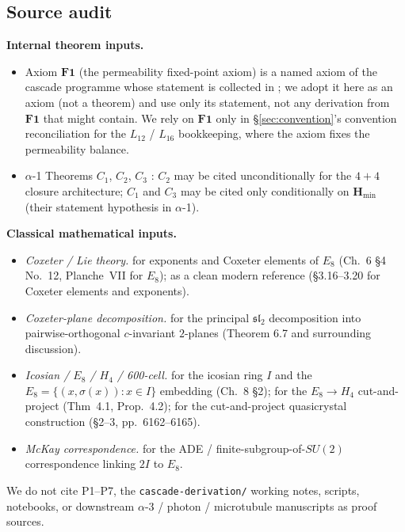 \documentclass[11pt, a4paper]{amsart}
\theoremstyle{definition}
\newcommand{\Hmin}{\mathbf{H}_{\min}}
\begin{document}
\subsection{Source audit}

\textbf{Internal theorem inputs.}
\begin{itemize}
\item Axiom $\mathbf{F1}$ (the permeability fixed-point axiom)
  is a named axiom of the cascade programme whose statement is
  collected in \cite[\S F1]{CascadeFoundations}; we adopt it
  here as an axiom (not a theorem) and use only its statement,
  not any derivation from $\mathbf{F1}$ that \cite{CascadeFoundations}
  might contain. We rely on $\mathbf{F1}$ only in
  \S\ref{sec:convention}'s convention reconciliation for the
  $L_{12}$ / $L_{16}$ bookkeeping, where the axiom fixes the
  permeability balance.
\item $\alpha$-1 Theorems $C_1$, $C_2$, $C_3$
  \cite{Cascade12D}: $C_2$ may be cited unconditionally for
  the $4 + 4$ closure architecture; $C_1$ and $C_3$ may be
  cited only conditionally on $\Hmin$ (their statement
  hypothesis in $\alpha$-1).
\end{itemize}

\textbf{Classical mathematical inputs.}
\begin{itemize}
\item \emph{Coxeter / Lie theory.}
  \cite{Bourbaki46} for exponents and Coxeter elements of
  $E_8$ (Ch.~6 \S4 No.~12, Planche~VII for $E_8$);
  \cite{Humphreys} as a clean modern reference (\S 3.16--3.20
  for Coxeter elements and exponents).
\item \emph{Coxeter-plane decomposition.}
  \cite{Kostant59} for the principal $\mathfrak{sl}_2$
  decomposition into pairwise-orthogonal $c$-invariant
  $2$-planes (Theorem 6.7 and surrounding discussion).
\item \emph{Icosian / $E_8$ / $H_4$ / 600-cell.}
  \cite{ConwaySloane} for the icosian ring $I$ and the
  $E_8 = \{(x, \sigma(x)) : x \in I\}$ embedding (Ch.~8 \S2);
  \cite{MoodyPatera} for the $E_8 \to H_4$ cut-and-project
  (Thm~4.1, Prop.~4.2); \cite{ElserSloane} for the
  cut-and-project quasicrystal construction (\S2--3,
  pp.~6162--6165).
\item \emph{McKay correspondence.}
  \cite{McKay80} for the ADE / finite-subgroup-of-$SU(2)$
  correspondence linking $2I$ to $E_8$.
\end{itemize}

We do not cite P1--P7, the \texttt{cascade-derivation/} working
notes, scripts, notebooks, or downstream $\alpha$-3 / photon /
microtubule manuscripts as proof sources.
\end{document}
